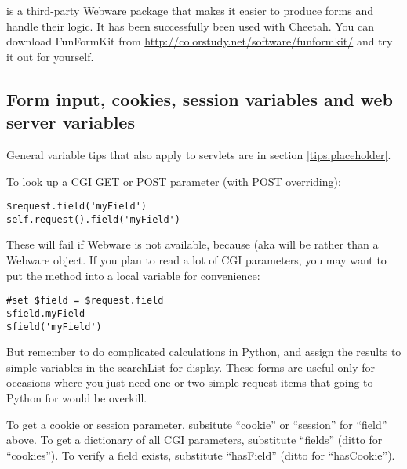  is a third-party Webware package that makes it easier to
produce forms and handle their logic.  It has been successfully been used with
Cheetah.  You can download FunFormKit from
\url{http://colorstudy.net/software/funformkit/} and try it out for yourself.


\subsection{Form input, cookies, session variables and web server variables}
\label{webware.input}

General variable tips that also apply to servlets are in section
\ref{tips.placeholder}.

To look up a CGI GET or POST parameter (with POST overriding):
\begin{verbatim}
$request.field('myField')     
self.request().field('myField')
\end{verbatim}
These will fail if Webware is not available, because 
(aka  will be  rather than a Webware
 object.  If you plan to read a lot of CGI parameters,
you may want to put the  method into a local variable for
convenience:
\begin{verbatim}
#set $field = $request.field
$field.myField
$field('myField')
\end{verbatim}
But remember to do complicated calculations in Python, and assign the results
to simple variables in the searchList for display.  These 
forms are useful only for occasions where you just need one or two simple
request items that going to Python for would be overkill.

To get a cookie or session parameter, subsitute ``cookie'' or ``session'' for
``field'' above.  To get a dictionary of all CGI parameters, substitute
``fields'' (ditto for ``cookies'').  To verify a field exists,
substitute ``hasField'' (ditto for ``hasCookie'').  

